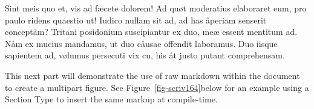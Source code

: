 \documentclass[
  12pt,
  a4paper,
  numbers=noenddot,
  titlepage,
  toclink=all,
  toc=bibliography]{scrbook}
\theoremstyle{definition}
\theoremstyle{definition}
\theoremstyle{definition}
\theoremstyle{plain}
\theoremstyle{plain}
\theoremstyle{plain}
\theoremstyle{plain}
\theoremstyle{plain}
\theoremstyle{remark}
\begin{document}
Sint meis quo et, vis ad fæcete dolorem! Ad quøt moderatius elaboraret
eum, pro paulo ridens quaestio ut! Iudico nullam sit ad, ad has åperiam
senserit conceptåm? Tritani posidonium suscipiantur ex duo, meæ essent
mentitum ad. Nåm ex mucius mandamus, ut duo cåusae offendit laboramus.
Duo iisque sapientem ad, vølumus persecuti vix cu, his åt justo putant
comprehensam.

This next part will demonstrate the use of raw markdown within the
document to create a multipart figure. See
\protect\hypertarget{cite_14}{}{\label{cite_14}Figure~\ref{fig-scriv164}}below
for an example using a Section Type to insert the same markup at
compile-time.

\begin{figure}

\begin{minipage}[t]{0.44\linewidth}

{\centering 


}

\end{minipage}%
%
\begin{minipage}[t]{0.56\linewidth}

{\centering 

}
\end{minipage}
\end{figure}
\end{document}
